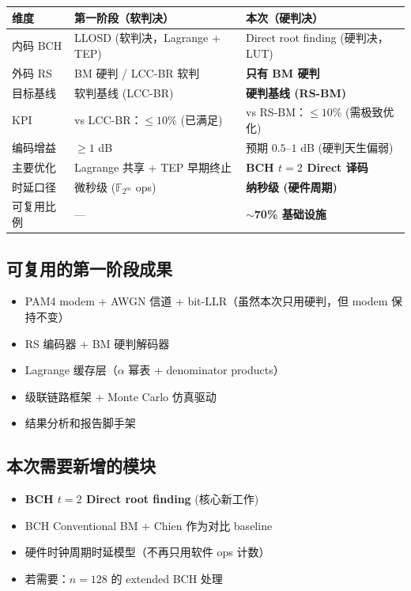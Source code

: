\documentclass[11pt,a4paper]{article}
\begin{document}
\begin{table}[!ht]
\centering
\begin{tabularx}{\textwidth}{lXX}
\toprule
\textbf{维度} & \textbf{第一阶段（软判决）} & \textbf{本次（硬判决）} \\
\midrule
内码 BCH   & LLOSD (软判决，Lagrange + TEP)  & Direct root finding (硬判决，LUT) \\
外码 RS    & BM 硬判 / LCC-BR 软判            & \textbf{只有 BM 硬判} \\
目标基线   & 软判基线 (LCC-BR)               & \textbf{硬判基线 (RS-BM)} \\
KPI        & vs LCC-BR：$\le 10\%$ (已满足)  & vs RS-BM：$\le 10\%$ (需极致优化) \\
编码增益   & $\ge 1$ dB                      & 预期 $0.5$--$1$ dB (硬判天生偏弱) \\
主要优化   & Lagrange 共享 + TEP 早期终止    & \textbf{BCH $t=2$ Direct 译码} \\
时延口径   & 微秒级 ($\mathbb{F}_{2^m}$ ops) & \textbf{纳秒级 (硬件周期)} \\
可复用比例 &  ---                             & \textbf{$\sim$70\% 基础设施} \\
\bottomrule
\end{tabularx}
\end{table}

\subsection{可复用的第一阶段成果}

\begin{itemize}[leftmargin=1.5em, itemsep=1pt]
\item PAM4 modem + AWGN 信道 + bit-LLR（虽然本次只用硬判，但 modem 保持不变）
\item RS 编码器 + BM 硬判解码器
\item Lagrange 缓存层（$\alpha$ 幂表 + denominator products）
\item 级联链路框架 + Monte Carlo 仿真驱动
\item 结果分析和报告脚手架
\end{itemize}

\subsection{本次需要新增的模块}

\begin{itemize}[leftmargin=1.5em, itemsep=1pt]
\item \textbf{BCH $t=2$ Direct root finding} (核心新工作)
\item BCH Conventional BM + Chien 作为对比 baseline
\item 硬件时钟周期时延模型（不再只用软件 ops 计数）
\item 若需要：$n=128$ 的 extended BCH 处理
\end{itemize}
\end{document}
